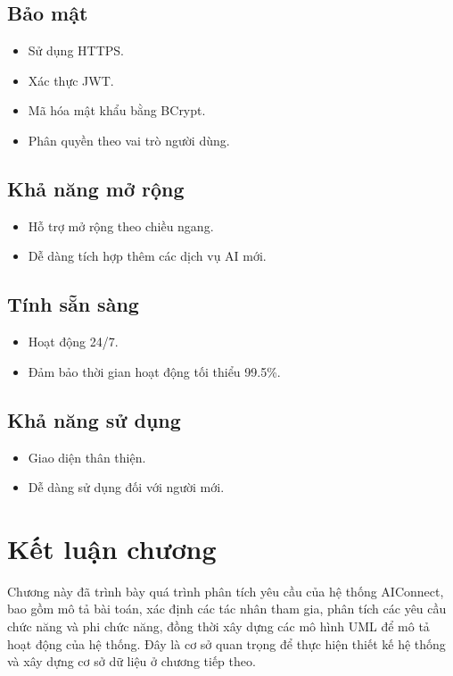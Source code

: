 \subsection{Bảo mật}

\begin{itemize}
    \item Sử dụng HTTPS.
    \item Xác thực JWT.
    \item Mã hóa mật khẩu bằng BCrypt.
    \item Phân quyền theo vai trò người dùng.
\end{itemize}

\subsection{Khả năng mở rộng}

\begin{itemize}
    \item Hỗ trợ mở rộng theo chiều ngang.
    \item Dễ dàng tích hợp thêm các dịch vụ AI mới.
\end{itemize}

\subsection{Tính sẵn sàng}

\begin{itemize}
    \item Hoạt động 24/7.
    \item Đảm bảo thời gian hoạt động tối thiểu 99.5\%.
\end{itemize}

\subsection{Khả năng sử dụng}

\begin{itemize}
    \item Giao diện thân thiện.
    \item Dễ dàng sử dụng đối với người mới.
\end{itemize}

\section{Kết luận chương}

Chương này đã trình bày quá trình phân tích yêu cầu của hệ thống AIConnect, bao gồm mô tả bài toán, xác định các tác nhân tham gia, phân tích các yêu cầu chức năng và phi chức năng, đồng thời xây dựng các mô hình UML để mô tả hoạt động của hệ thống. Đây là cơ sở quan trọng để thực hiện thiết kế hệ thống và xây dựng cơ sở dữ liệu ở chương tiếp theo.